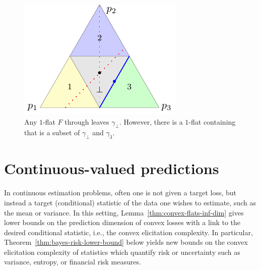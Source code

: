 \documentclass[anon,12pt]{colt2021} %
\newcommand{\ones}{\mathbbm{1}}
\begin{document}
\begin{figure}[ht]
\begin{minipage}{0.45\linewidth}
	\includegraphics[width=\linewidth]{tikz/flats-bound.pdf}
	\caption{Any $1$-flat $F$ through \textbullet leaves $\gamma_\bot$.
	However, there is a $1$-flat containing {\color{blue} \textbullet} that is a subset of $\gamma_\bot$ and $\gamma_3$.
	}
	\label{fig:flats-bound}
\end{minipage}
\end{figure}

\section{Continuous-valued predictions}\label{sec:contin-consis}

In continuous estimation problems, often one is not given a target loss, but instead a target (conditional) statistic of the data one wishes to estimate, such as the mean or variance.
In this setting, Lemma~\ref{thm:convex-flats-inf-dim} gives lower bounds on the prediction dimension of convex losses with a link to the desired conditional statistic, i.e., the convex elicitation complexity.
In particular,
Theorem~\ref{thm:bayes-risk-lower-bound} below yields new bounds on the convex elicitation complexity of statistics which quantify risk or uncertainty such as variance, entropy, or financial risk measures.
\end{document}
